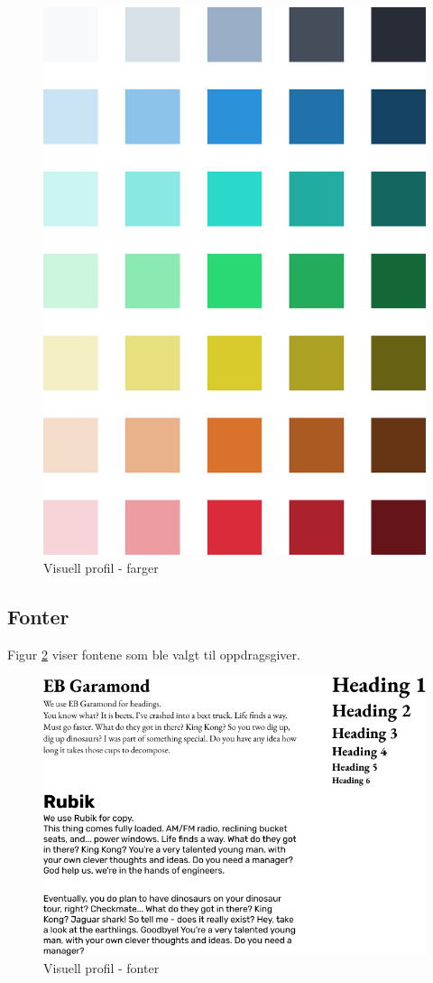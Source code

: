 \begin{figure}[H]
    \centering
    \includegraphics[width=.5\textwidth]{design/colors.png}
    \caption{Visuell profil - farger}
    \label{fig:colors}
\end{figure}

\subsection{Fonter}
Figur \ref{fig:typography} viser fontene som ble valgt til oppdragsgiver.

\begin{figure}[H]
    \centering
    \includegraphics[width=\textwidth]{design/typography.png}
    \caption{Visuell profil - fonter}
    \label{fig:typography}
\end{figure}

